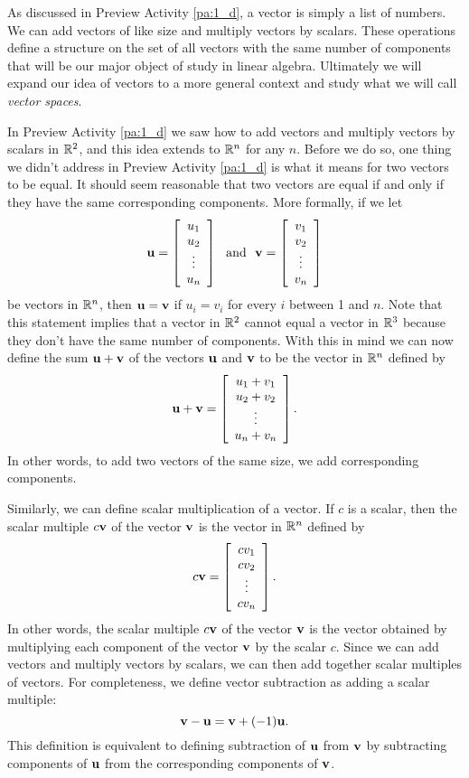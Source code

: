 
As discussed in Preview Activity \ref{pa:1_d}, a vector is simply a list of numbers. We can add vectors of like size and multiply vectors by scalars. These operations define a structure on the set of all vectors with the same number of components that will be our major object of study in linear algebra. Ultimately we will expand our idea of vectors to a more general context and study what we will call \emph{vector spaces}.

In Preview Activity \ref{pa:1_d} we saw how to add vectors and multiply vectors by scalars in $\mathbb{R}^2$, and this idea extends to $\mathbb{R}^n$ for any $n$. Before we do so, one thing we didn't address in Preview Activity \ref{pa:1_d}  is what it means for two vectors to be equal. It should seem reasonable that two vectors are equal if and only if they have the same corresponding components. More formally, if we let  
\[\mathbf{u} = \left[ \begin{array}{c} u_1 \\ u_2 \\ \vdots \\ u_n \end{array} \right] \ \text{ and } \ \mathbf{v} = \left[ \begin{array}{c} v_1 \\ v_2 \\ \vdots \\ v_n \end{array} \right]\]
be vectors in $\mathbb{R}^n$, then $\mathbf{u} = \mathbf{v}$ if $u_i = v_i$ for every $i$ between 1 and $n$. Note that this statement implies that a vector in $\mathbb{R}^2$ cannot equal a vector in $\mathbb{R}^3$ because they don't have the same number of components. With this in mind we can now define the sum $\mathbf{u} + \mathbf{v}$ of the vectors $\mathbf{u}$ and $\mathbf{v}$ to be the vector in $\mathbb{R}^n$ defined by
\[\mathbf{u} + \mathbf{v} = \left[ \begin{array}{c} u_1+v_1 \\ u_2+v_2 \\ \vdots \\ u_n+v_n \end{array} \right].\]
In other words, to add two vectors of the same size, we add corresponding components.

Similarly, we can define scalar multiplication of a vector. If $c$ is a scalar, then the scalar multiple $c \mathbf{v}$ of the vector $\mathbf{v}$ is the vector in $\mathbb{R}^n$ defined by
\[c\mathbf{v} = \left[ \begin{array}{c} cv_1 \\ cv_2 \\ \vdots \\ cv_n \end{array} \right].\]
In other words, the scalar multiple $c\mathbf{v}$ of the vector $\mathbf{v}$ is the vector obtained by multiplying each component of the vector $\mathbf{v}$ by the scalar $c$. Since we can add vectors and multiply vectors by scalars, we can then add together scalar multiples of vectors. For completeness, we define vector subtraction as adding a scalar multiple:
\[\mathbf{v} - \mathbf{u} = \mathbf{v} + (-1)\mathbf{u}.\]
This definition is equivalent to defining subtraction of $\mathbf{u}$ from $\mathbf{v}$ by subtracting components of $\mathbf{u}$ from the corresponding components of $\mathbf{v}$. 


